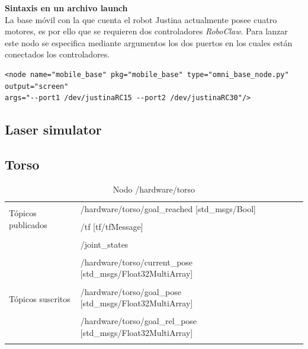 \documentclass[user_manual.tex]{subfiles}
\begin{document}
\textbf{Sintaxis en un archivo launch}\\
La base móvil con la que cuenta el robot Justina actualmente posee cuatro motores, es por ello que se requieren dos controladores \textit{RoboClaw}. Para lanzar este nodo se especifica mediante argumentos los dos puertos en los cuales están conectados los controladores.\\
\begin{verbatim}
<node name="mobile_base" pkg="mobile_base" type="omni_base_node.py" output="screen" 
args="--port1 /dev/justinaRC15 --port2 /dev/justinaRC30"/>
\end{verbatim}

\subsection{Laser simulator}

\subsection{Torso}

\begin{table}[H]
\begin{center}
\begin{tabular}{|l|p{6cm}|p{5cm}|}%
\hline

\multirow{4}{*}{Tópicos publicados}
& /hardware/torso/goal\_reached [std\_msgs/Bool] &  \\
& & \\
& /tf [tf/tfMessage] &  \\
& & \\
& /joint\_states  &  \\
& & \\
& /hardware/torso/current\_pose [std\_msgs/Float32MultiArray] &  \\
& & \\
\cline{1-3}

\multirow{2}{*}{Tópicos suscritos}
& /hardware/torso/goal\_pose [std\_msgs/Float32MultiArray] &  \\
& & \\
& /hardware/torso/goal\_rel\_pose [std\_msgs/Float32MultiArray] &  \\
& & \\
\cline{1-3} 

\end{tabular}
\caption{Nodo /hardware/torso}
\label{torso node}
\end{center}
\end{table}
\end{document}
